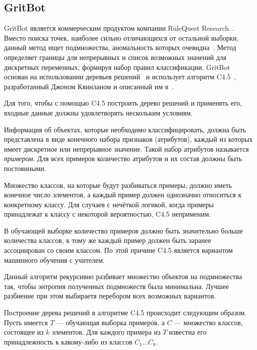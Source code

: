 \subsection{GritBot}
GritBot является коммерческим продуктом компании RuleQuest Research~\cite{GritBotWebPage}. Вместо поиска точек, наиболее сильно отличающихся от остальной выборки, данный метод ищет подмножества, аномальность которых очевидна~\cite{SchwabacherMachLearnAppl}. Метод определяет границы для непрерывных и список возможных значений для дискретных переменных, формируя набор правил классификации. GritBot основан на использовании деревьев решений~\cite{MartinCompUnsupervisedDetectionMethods} и использует алгоритм C4.5~\cite{MLInCyberTrust}, разработанный Джоном Квинланом и описанный им в~\cite{QuinlanC45}.

Для того, чтобы с помощью C4.5 построить дерево решений и применять его, входные данные должны удовлетворять нескольким условиям.

Информация об объектах, которые необходимо классифицировать, должна быть представлена в виде конечного набора признаков (атрибутов), каждый из которых имеет дискретное или непрерывное значение. Такой набор атрибутов называется \textit{примером}. Для всех примеров количество атрибутов и их состав должны быть постоянными.

Множество классов, на которые будут разбиваться примеры, должно иметь конечное число элементов, а каждый пример должен однозначно относиться к конкретному классу. Для случаев с нечёткой логикой, когда примеры принадлежат к классу с некоторой вероятностью, C4.5 неприменим.

В обучающей выборке количество примеров должно быть значительно больше количества классов, к тому же каждый пример должен быть заранее ассоциирован со своим классом. По этой причине C4.5 является вариантом машинного обучения с учителем.

Данный алгоритм рекурсивно разбивает множество объектов на подмножества так, чтобы энтропия полученных подмножеств была минимальна. Лучшее разбиение при этом выбираетя перебором всех возможных вариантов. 

Построение дерева решений в алгоритме C4.5 происходит следующим образом. Пусть имеется $T$ --- обучающая выборка примеров, а $C$ --- множество классов, состоящее из $k$ элементов. Для каждого примера из $T$ известна его принадлежность к какому-либо из классов $C_1\dots C_k$.

